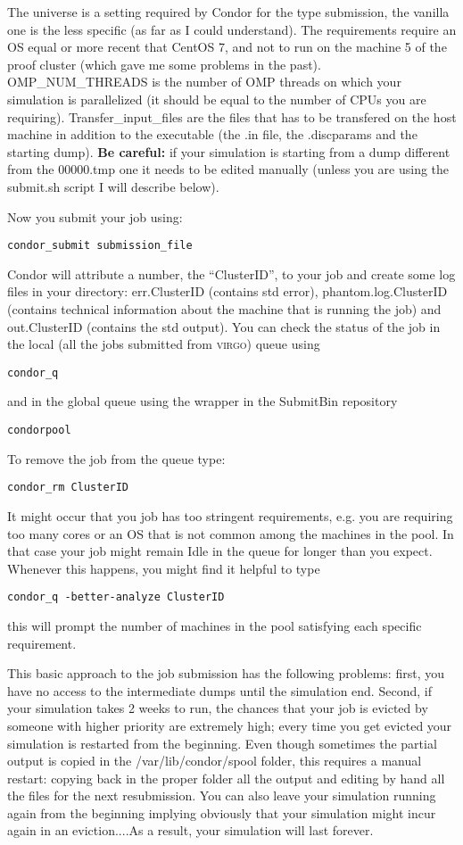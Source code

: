 \documentclass[10pt,a4paper,twoside]{article} %
\begin{document}
The universe is a setting required by Condor for the type submission, the vanilla one is the less specific (as far as I could understand). The requirements require an OS equal or more recent that CentOS 7, and not to run on the machine 5 of the proof cluster (which gave me some problems in the past). OMP\_NUM\_THREADS is the number of OMP threads on which your simulation is parallelized (it should be equal to the number of CPUs you are requiring). Transfer\_input\_files are the files that has to be transfered on the host machine in addition to the executable (the .in file, the .discparams and the starting dump). \textbf{Be careful:} if your simulation is starting from a dump different from the 00000.tmp one it needs to be edited manually (unless you are using the submit.sh script I will describe below).

Now you submit your job using:
\begin{verbatim}
condor_submit submission_file
\end{verbatim}
Condor will attribute a number, the ``ClusterID'', to your job and create some log files in your directory: err.ClusterID (contains std error), phantom.log.ClusterID (contains technical information about the machine that is running the job) and out.ClusterID (contains the std output). You can check the status of the job in the local (all the jobs submitted from \textsc{virgo}) queue using
\begin{verbatim}
condor_q
\end{verbatim}
and in the global queue using the wrapper in the SubmitBin repository
\begin{verbatim}
condorpool
\end{verbatim}
To remove the job from the queue type:
\begin{verbatim}
condor_rm ClusterID
\end{verbatim}
It might occur that you job has too stringent requirements, e.g. you are requiring too many cores or an OS that is not common among the machines in the pool. In that case your job might remain Idle in the queue for longer than you expect. Whenever this happens, you might find it helpful to type
\begin{verbatim}
condor_q -better-analyze ClusterID
\end{verbatim}
this will prompt the number of machines in the pool satisfying each specific requirement.

This basic approach to the job submission has the following problems: first, you have no access to the intermediate dumps until the simulation end. Second, if your simulation takes 2 weeks to run, the chances that your job is evicted by someone with higher priority are extremely high; every time you get evicted your simulation is restarted from the beginning. Even though sometimes the partial output is copied in the /var/lib/condor/spool folder, this requires a manual restart: copying back in the proper folder all the output and editing by hand all the files for the next resubmission. You can also leave your simulation running again from the beginning implying obviously that your simulation might incur again in an eviction....As a result, your simulation will last forever.
\end{document}
